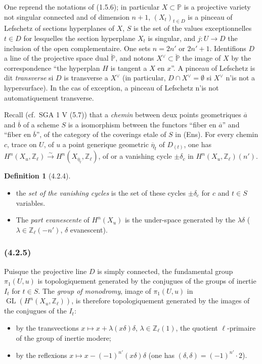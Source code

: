 \documentclass[12pt,a4paper]{article}
\theoremstyle{plain}
\theoremstyle{definition}
\newtheorem{definition}[theorem]{Definition}
\theoremstyle{remark}
\DeclareMathOperator{\GL}{GL}
\newcommand{\bbP}{\mathbb{P}}
\newcommand{\Zl}{\mathbb{Z}_\ell}
\begin{document}
One reprend the notations of (1.5.6); in particular $X \subset \bbP$ is a projective variety not singular connected and of dimension $n+1$, $(X_t)_{t \in D}$ is a pinceau of Lefschetz of sections hyperplanes of $X$, $S$ is the set of the values exceptionnelles $t \in D$ for lesquelles the section hyperplane $X_t$ is singular, and $j : U \to D$ the inclusion of the open complementaire. One sets $n = 2n'$ or $2n'+1$. Identifions $D$ a line of the projective space dual $\check{\bbP}$, and notons $X^\vee \subset \check{\bbP}$ the image of $X$ by the correspondence ``the hyperplan $H$ is tangent a $X$ en $x$''. A pinceau of Lefschetz is dit \emph{transverse} si $D$ is transverse a $X^\vee$ (in particular, $D \cap X^\vee = \emptyset$ si $X^\vee$ n'is not a hypersurface). In the cas of exception, a pinceau of Lefschetz n'is not automatiquement transverse.

Recall (cf.~SGA 1 V (5.7)) that a \emph{chemin} between deux points geometriques $\overline{a}$ and $\overline{b}$ of a scheme $S$ is a isomorphism between the functors ``fiber en $\overline{a}$'' and ``fiber en $\overline{b}$'', of the category of the coverings etale of $S$ in (Ens). For every chemin $c$, trace on $U$, of $u$ a point generique geometric $\overline{\eta}_t$ of $D_{(t)}$, one has $H^n(X_u, \Zl) \xrightarrow{\sim} H^n(X_{\overline{\eta}_t}, \Zl)$, of or a vanishing cycle $\pm \delta_c$ in $H^n(X_u, \Zl)(n')$.

\begin{definition}[4.2.4]
\ \begin{itemize}
\item[(i)] the \emph{set of the vanishing cycles} is the set of these cycles $\pm \delta_c$ for $c$ and $t \in S$ variables.
\item[(ii)] The \emph{part evanescente} of $H^n(X_u)$ is the under-space generated by the $\lambda \delta$ ($\lambda \in \Zl(-n')$, $\delta$ evanescent).
\end{itemize}
\end{definition}

\subsubsection*{\textup{(4.2.5)}}

Puisque the projective line $D$ is simply connected, the fundamental group $\pi_1(U, u)$ is topologiquement generated by the conjugues of the groups of inertie $I_t$ for $t \in S$. The \emph{group of monodromy}, image of $\pi_1(U, u)$ in $\GL(H^n(X_u, \Zl))$, is therefore topologiquement generated by the images of the conjugues of the $I_t$:
\begin{itemize}
\item[$n$ impair:] by the transvections $x \mapsto x + \lambda(x\delta)\delta$, $\lambda \in \Zl(1)$, the quotient $\ell$-primaire of the group of inertie modere;
\item[$n$ pair:] by the reflexions $x \mapsto x - (-1)^{n'}(x\delta)\delta$ (one has $(\delta, \delta) = (-1)^{n'} \cdot 2$).
\end{itemize}
\end{document}

